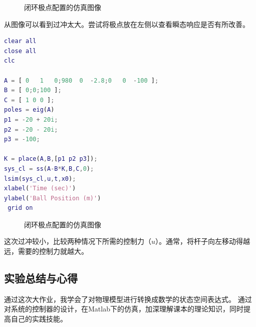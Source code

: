 \documentclass[UTF8]{ctexart}
\begin{document}
\par \begin{figure}[ht]   
  \caption{\label{1} 闭环极点配置的仿真图像}      
 \end{figure}
\par 从图像可以看到过冲太大。尝试将极点放在左侧以查看瞬态响应是否有所改善。
\par  \begin{lstlisting}[language=matlab,escapeinside=``]
clear all
close all
clc

A = [ 0   1   0;980  0  -2.8;0   0  -100 ];
B = [ 0;0;100 ];
C = [ 1 0 0 ];
poles = eig(A)
p1 = -20 + 20i;
p2 = -20 - 20i;
p3 = -100;

K = place(A,B,[p1 p2 p3]);
sys_cl = ss(A-B*K,B,C,0);
lsim(sys_cl,u,t,x0);
xlabel('Time (sec)')
ylabel('Ball Position (m)')
 grid on
\end{lstlisting}
\newpage
\par \begin{figure}[ht]   
  \caption{\label{1} 闭环极点配置的仿真图像}      
 \end{figure}
\par  这次过冲较小，比较两种情况下所需的控制力（$ u $）。通常，将杆子向左移动得越远，需要的控制力就越大。
	
\subsection{实验总结与心得}	
\par  	通过这次大作业，我学会了对物理模型进行转换成数学的状态空间表达式。	通过对系统的控制器的设计，在Matlab下的仿真，加深理解课本的理论知识，同时提高自己的实践技能。
\end{document}
